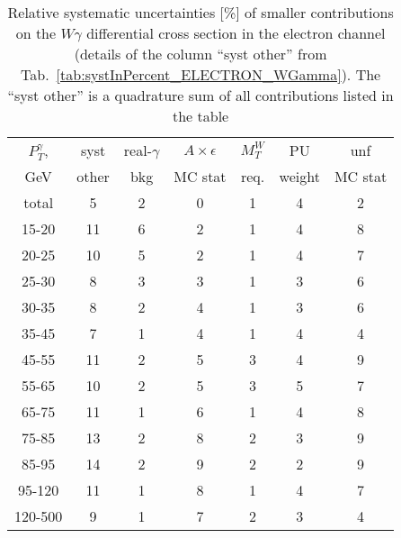 \begin{table}[h]
  \scriptsize
  \begin{center}
  \caption{Relative systematic uncertainties [\%] of smaller contributions  on the $W\gamma$ differential cross section in the electron channel (details of the column ``syst other'' from Tab.~\ref{tab:systInPercent_ELECTRON_WGamma}). The ``syst other'' is a quadrature sum of all contributions listed in the table}
  \begin{tabular}{|c|c|c|c|c|c|c|}
    $P_T^{\gamma}$,  & syst & real-$\gamma$ & $A\times\epsilon$ & $M_T^W$ & PU & unf\\
    GeV  & other & bkg & MC stat & req. & weight & MC stat\\ \hline
    total  & 5 & 2 & 0 & 1 & 4 & 2 \\ \hline
    15-20 & 11 & 6 & 2 & 1 & 4 & 8 \\ \hline
    20-25 & 10 & 5 & 2 & 1 & 4 & 7 \\ \hline
    25-30 & 8 & 3 & 3 & 1 & 3 & 6 \\ \hline
    30-35 & 8 & 2 & 4 & 1 & 3 & 6 \\ \hline
    35-45 & 7 & 1 & 4 & 1 & 4 & 4 \\ \hline
    45-55 & 11 & 2 & 5 & 3 & 4 & 9 \\ \hline
    55-65 & 10 & 2 & 5 & 3 & 5 & 7 \\ \hline
    65-75 & 11 & 1 & 6 & 1 & 4 & 8 \\ \hline
    75-85 & 13 & 2 & 8 & 2 & 3 & 9 \\ \hline
    85-95 & 14 & 2 & 9 & 2 & 2 & 9 \\ \hline
    95-120 & 11 & 1 & 8 & 1 & 4 & 7 \\ \hline
    120-500 & 9 & 1 & 7 & 2 & 3 & 4 \\ \hline
  \end{tabular}
  \label{tab:systInPercentSmallSysts_ELECTRON_WGamma}
  \end{center}
\end{table}
